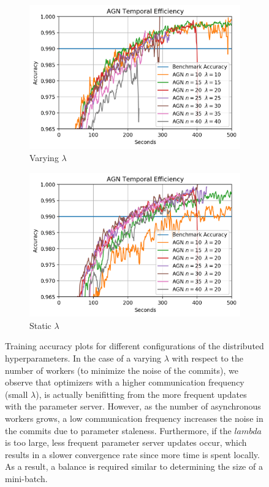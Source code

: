 \begin{figure}[H]
  \centering
  \begin{subfigure}{.49\textwidth}
    \centering
    \includegraphics[width=\linewidth]{resources/images/agn_temporal_efficiency}
    \caption{Varying $\lambda$}
  \end{subfigure}
  \begin{subfigure}{.49\textwidth}
    \centering
    \includegraphics[width=\linewidth]{resources/images/agn_temporal_efficiency_2}
    \caption{Static $\lambda$}
  \end{subfigure}
  \caption{Training accuracy plots for different configurations of the distributed hyperparameters. In the case of a varying $\lambda$ with respect to the number of workers (to minimize the noise of the commits), we observe that optimizers with a higher communication frequency (small $\lambda$), is actually benifitting from the more frequent updates with the parameter server. However, as the number of asynchronous workers grows, a low communication frequency increases the noise in the commits due to parameter staleness. Furthermore, if the $lambda$ is too large, less frequent parameter server updates occur, which results in a slower convergence rate since more time is spent locally. As a result, a balance is required similar to determining the size of a mini-batch.}
  \label{fig:agn_temporal_efficiency}
\end{figure}

